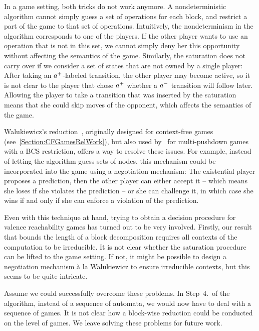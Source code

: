 \documentclass[../../diss.tex]{subfiles}
\begin{document}
In a game setting, both tricks do not work anymore.
A nondeterministic algorithm cannot simply guess a set of operations for each block, and restrict a part of the game to that set of operations.
Intuitively, the nondeterminism in the algorithm corresponds to one of the players.
If the other player wants to use an operation that is not in this set, we cannot simply deny her this opportunity without affecting the semantics of the game.
Similarly, the saturation does not carry over if we consider a set of states that are not owned by a single player:
After taking an ${a}^+$-labeled transition, the other player may become active, so it is not clear to the player that chose ${a}^+$ whether a ${a}^-$ transition will follow later.
Allowing the player to take a transition that was inserted by the saturation means that she could skip moves of the opponent, which affects the semantics of the game.

Walukiewicz's reduction~\cite{Walukiewicz01}, originally designed for context-free games (see~\cref{Section:CFGamesRelWork}), but also used by~ for multi-pushdown games with a BCS restriction, offers a way to resolve these issues.
For example, instead of letting the algorithm guess sets of nodes, this mechanism could be incorporated into the game using a negotiation mechanism:
The existential player proposes a prediction, then the other player can either accept it -- which means she loses if she violates the prediction -- or she can challenge it, in which case she wins if and only if she can enforce a violation of the prediction.

Even with this technique at hand, trying to obtain a decision procedure for valence reachability games has turned out to be very involved.
Firstly, our result that bounds the length of a block decomposition requires all contexts of the computation to be irreducible.
It is not clear whether the saturation procedure can be lifted to the game setting.
If not, it might be possible to design a negotiation mechanism à la Walukiewicz to ensure irreducible contexts, but this seems to be quite intricate.

Assume we could successfully overcome these problems.
In Step~4.~of the algorithm, instead of a sequence of automata, we would now have to deal with a sequence of games.
It is not clear how a block-wise reduction could be conducted on the level of games.
We leave solving these problems for future work.
\end{document}
